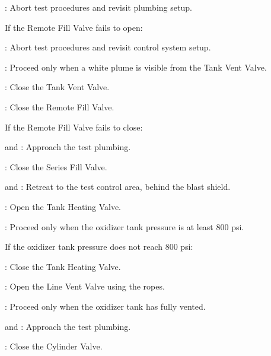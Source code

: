 \begin{checklist}
\begin{checklist}[label=$\bullet$]
\begin{checklist}
            \item \ops{}: Abort test procedures and revisit plumbing setup.
        \end{checklist}
        \item If the Remote Fill Valve fails to open:
        \begin{checklist}
            \item \ops{}: Abort test procedures and revisit control system setup.
        \end{checklist}
    \end{checklist}
    \item \secondary{}: Proceed only when a white plume is visible from the Tank Vent Valve.
    \item \control{}: Close the Tank Vent Valve.
    \item \control{}: Close the Remote Fill Valve.
    \begin{checklist}[label=$\bullet$]
        \item If the Remote Fill Valve fails to close:
        \begin{checklist}
            \item \primary{} and \secondary{}: Approach the test plumbing.
            \item \primary{}: Close the Series Fill Valve.
            \item \primary{} and \secondary{}: Retreat to the test control area, behind the blast shield.
        \end{checklist}
    \end{checklist}
    \item \heat{}: Open the Tank Heating Valve.
    \item \daq{}: Proceed only when the oxidizer tank pressure is at least 800 psi.
    \begin{checklist}[label=$\bullet$]
        \item If the oxidizer tank pressure does not reach 800 psi:
        \begin{checklist}
            \item \heat{}: Close the Tank Heating Valve.
            \item \primary{}: Open the Line Vent Valve using the ropes.
            \item \ops{}: Proceed only when the oxidizer tank has fully vented.
            \item \primary{} and \secondary{}: Approach the test plumbing.
            \item \primary{}: Close the Cylinder Valve.

\end{checklist}
\end{checklist}
\end{checklist}
